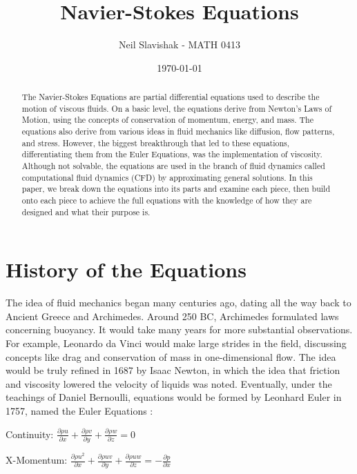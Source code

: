 \documentclass[12pt]{article}
\title{Navier-Stokes Equations}
\author{Neil Slavishak - MATH 0413}
\date{\today}
\begin{document}
\maketitle

\begin{abstract}
The Navier-Stokes Equations are partial differential equations used to
describe the motion of viscous fluids. On a basic level, the equations derive from Newton's Laws of Motion, using the concepts of conservation of momentum, energy, and mass. The equations also derive from various ideas in fluid mechanics like diffusion, flow patterns, and stress. However, the biggest breakthrough that led to these equations, differentiating them from the Euler Equations, was the implementation of viscosity. Although not solvable, the equations are used in the branch of fluid dynamics called computational fluid dynamics (CFD) by approximating general solutions. In this paper, we break down the equations into its parts and examine each piece, then build onto each piece to achieve the full equations with the knowledge of how they are designed and what their purpose is.
\end{abstract}
\section{History of the Equations}
The idea of fluid mechanics began many centuries ago, dating all the way back to Ancient Greece and Archimedes. Around 250 BC, Archimedes formulated laws concerning buoyancy. It would take many years for more substantial observations. For example, Leonardo da Vinci would make large strides in the field, discussing concepts like drag and conservation of mass in one-dimensional flow. The idea would be truly refined in 1687 by Isaac Newton, in which the idea that friction and viscosity lowered the velocity of liquids was noted. \cite{Navier2} Eventually, under the teachings of Daniel Bernoulli, equations would be formed by Leonhard Euler in 1757, named the Euler Equations \cite{Euler}: 

\begin{center} 
Continuity: $\frac{\partial \rho u}{\partial x} + \frac{\partial \rho v}{\partial y} + \frac{\partial \rho w}{\partial z} = 0$\end{center}

\begin{center} X-Momentum: $\frac{\partial \rho u^2}{\partial x} + \frac{\partial \rho uv}{\partial y} + \frac{\partial \rho uw}{\partial z} =  -\frac{\partial p}{\partial x}$ \end{center}
\end{document}
